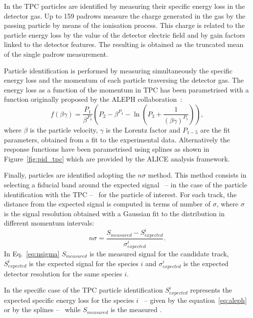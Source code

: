 In the TPC particles are identified by measuring their specific energy loss in the detector gas.
Up to 159 padrows measure the charge generated in the gas by the passing particle by means of the
ionisation process. 
This charge is related to the particle energy loss by the value of the detector electric
field and by gain factors linked to the detector features. 
The resulting \dedx is obtained as the truncated mean of the single padrow measurement.

Particle identification is performed by measuring simultaneously the specific energy loss \dedx 
and the momentum of each particle traversing the detector gas.
The energy loss as a function of the momentum in TPC has been parametrised with a function originally
proposed by the ALEPH collaboration~\cite{aleph}:
\begin{equation} \label{eq:aleph}
    f(\beta \gamma) = \frac{P_{1}}{\beta^{P_{4}}} \left( P_{2} - \beta^{P_{4}}
    - \ln \left( P_{3} + \frac{1}{(\beta \gamma)^{P_{5}}} \right) \right),
\end{equation} 
where $\beta$ is the particle velocity, $\gamma$ is the Lorentz factor and $P_{1-5}$ are the fit
parameters, obtained from a fit to the experimental data.
Alternatively the response functions have been parametrised using splines as shown in 
Figure~\ref{fig:pid_tpc} which are provided by the ALICE analysis framework.

Finally, particles are identified adopting the $n\sigma$ method.
This method consists in selecting a fiducial band around the expected signal \ -- \dede in the case of
the  particle identification with the TPC -- \ for the particle of interest.
For each track, the distance from the expected signal is computed in terms of 
number of $\sigma$, where $\sigma$ is the signal resolution obtained with a Gaussian fit to the 
\dedx distribution in different momentum intervals:
\begin{equation} \label{eq:nsigma}
    n\sigma = \frac{S_{measured} - S^{i}_{expected}}{\sigma^{i}_{expected}}.
\end{equation}
In Eq.~\eqref{eq:nsigma} $S_{measured}$ is the measured signal for the candidate track,
$S^{i}_{expected}$ is the expected signal for the species $i$ and $\sigma^{i}_{expected}$ is the
expected detector resolution for the same species $i$.

In the specific case of the TPC particle identification $S^{i}_{expected}$ represents the
expected specific energy loss for the species $i$ \ -- given by the equation~\eqref{eq:aleph}
or by the splines -- \ while $S_{measured}$ is the measured \dedx.

